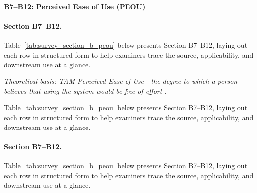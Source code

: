 \noindent\textbf{B7--B12: Perceived Ease of Use (PEOU)}
\paragraph{Section B7--B12.}
\noindent Table~\ref{tab:survey_section_b_peou} below presents Section B7--B12, laying out each row in structured form to help examiners trace the source, applicability, and downstream use at a glance. %


\noindent\textit{Theoretical basis: TAM Perceived Ease of Use---the degree to which a person believes that using the system would be free of effort \cite{davis1989tam}.}

{\tablestripes\tablefontsize

\noindent Table~\ref{tab:survey_section_b_peou} below presents Section B7--B12, laying out each row in structured form to help examiners trace the source, applicability, and downstream use at a glance. %
\paragraph{Section B7--B12.} %
\noindent Table~\ref{tab:survey_section_b_peou} below presents Section B7--B12, laying out each row in structured form to help examiners trace the source, applicability, and downstream use at a glance. %



}
